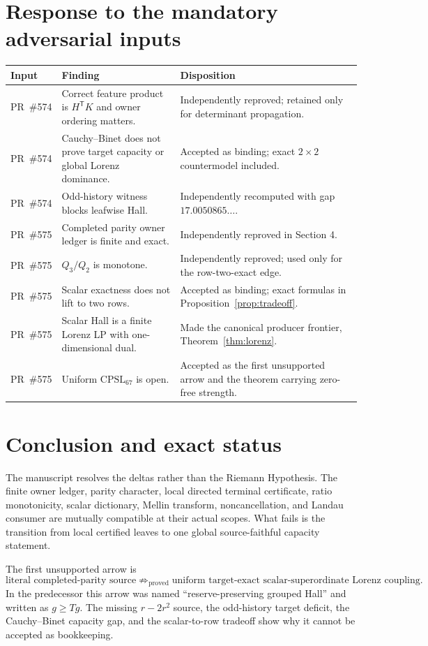 \documentclass[11pt]{article}
\newcommand{\CPSL}{\mathrm{CPSL}_{67}}
\newcommand{\1}{\mathbf 1}
\begin{document}
\section{Response to the mandatory adversarial inputs}

\begin{longtable}{p{}p{}p{}}
\toprule
Input & Finding & Disposition\\
\midrule
PR~\#574 & Correct feature product is $H^{\mathsf T}K$ and owner ordering matters. & Independently reproved; retained only for determinant propagation.\\
PR~\#574 & Cauchy--Binet does not prove target capacity or global Lorenz dominance. & Accepted as binding; exact $2\times2$ countermodel included.\\
PR~\#574 & Odd-history witness blocks leafwise Hall. & Independently recomputed with gap $17.0050865\ldots$.\\
PR~\#575 & Completed parity owner ledger is finite and exact. & Independently reproved in Section 4.\\
PR~\#575 & $Q_3/Q_2$ is monotone. & Independently reproved; used only for the row-two-exact edge.\\
PR~\#575 & Scalar exactness does not lift to two rows. & Accepted as binding; exact formulas in Proposition~\ref{prop:tradeoff}.\\
PR~\#575 & Scalar Hall is a finite Lorenz LP with one-dimensional dual. & Made the canonical producer frontier, Theorem~\ref{thm:lorenz}.\\
PR~\#575 & Uniform $\CPSL$ is open. & Accepted as the first unsupported arrow and the theorem carrying zero-free strength.\\
\bottomrule
\end{longtable}

\section{Conclusion and exact status}

The manuscript resolves the deltas rather than the Riemann Hypothesis.  The finite owner ledger, parity character, local directed terminal certificate, ratio monotonicity, scalar dictionary, Mellin transform, noncancellation, and Landau consumer are mutually compatible at their actual scopes.  What fails is the transition from local certified leaves to one global source-faithful capacity statement.

The first unsupported arrow is
\[
\boxed{
\text{literal completed-parity source}
\not\Longrightarrow_{\text{proved}}
\text{uniform target-exact scalar-superordinate Lorenz coupling}.}
\]
In the predecessor this arrow was named ``reserve-preserving grouped Hall'' and written as $g\ge Tg$.  The missing $r-2r^2$ source, the odd-history target deficit, the Cauchy--Binet capacity gap, and the scalar-to-row tradeoff show why it cannot be accepted as bookkeeping.
\end{document}

